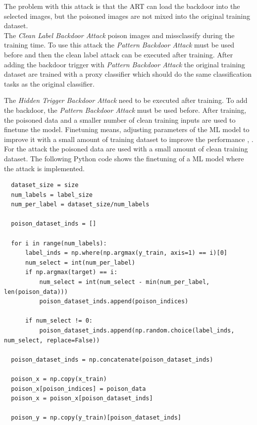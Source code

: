 The problem with this attack is that the ART can load the backdoor into the selected images, but the poisoned images are not mixed into the original training dataset. \\
The \textit{Clean Label Backdoor Attack} \cite{turner2018clean} poison images and missclassify during the training time. To use this attack the \textit{Pattern Backdoor Attack} must be
used before and then the clean label attack can be executed after training. After adding the backdoor trigger with \textit{Pattern Backdoor Attack} the original training dataset are trained
with a proxy classifier which should do the same classification tasks as the original classifier.

The \textit{Hidden Trigger Backdoor Attack} \cite{DBLP:journals/corr/abs-1910-00033} need to be executed after training. To add the backdoor, the \textit{Pattern Backdoor Attack} must be
used before. After training, the poisoned data and a smaller number of clean training inputs are used to finetune the model. Finetuning means, adjusting parameters of the ML model to
improve it with a small amount of training dataset to improve the performance \cite{DBLP:conf/acl/LiWTTTPBCA20}, \cite{DBLP:journals/corr/abs-2112-08691}. For the attack the poisoned data
are used with a small amount of clean training dataset. The following Python code shows the finetuning of a ML model where the attack is implemented.

\begin{lstlisting}
  dataset_size = size
  num_labels = label_size
  num_per_label = dataset_size/num_labels

  poison_dataset_inds = []

  for i in range(num_labels):
      label_inds = np.where(np.argmax(y_train, axis=1) == i)[0]
      num_select = int(num_per_label)
      if np.argmax(target) == i:
          num_select = int(num_select - min(num_per_label, len(poison_data)))
          poison_dataset_inds.append(poison_indices)

      if num_select != 0:
          poison_dataset_inds.append(np.random.choice(label_inds, num_select, replace=False))

  poison_dataset_inds = np.concatenate(poison_dataset_inds)

  poison_x = np.copy(x_train)
  poison_x[poison_indices] = poison_data
  poison_x = poison_x[poison_dataset_inds]

  poison_y = np.copy(y_train)[poison_dataset_inds]
\end{lstlisting}

